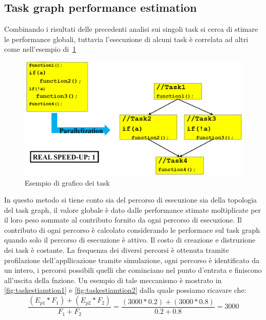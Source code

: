 \subsection{Task graph performance estimation}
Combinando i risultati delle precedenti analisi sui singoli task si cerca di stimare le performance globali, tuttavia l'esecuzione di alcuni task è correlata ad altri come nell'esempio di \figurename\,\ref{fig:taskgraph}
\begin{figure}
\centering
\includegraphics[scale=0.3]{img/taskgraph.png}
\caption{Esempio di grafico dei task}\label{fig:taskgraph}
\end{figure}
In questo metodo si tiene conto sia del percorso di esecuzione sia della topologia del task graph, il valore globale è dato dalle performance stimate moltiplicate per il loro peso sommate al contributo fornito da ogni percorso di esecuzione. Il contributo di ogni percorso è calcolato considerando le performace sul task graph quando solo il percorso di esecuzione è attivo. Il costo di creazione e distruzione dei task è costante. La frequenza dei diversi percorsi è ottenuta tramite profilazione dell'appllicazione tramite simulazione, ogni percorso è identificato da un intero, i percorsi possibili quelli che cominciano nel punto d'entrata e finiscono all'uscita della fnzione. Un esempio di tale meccanismo è mostrato in \figurename\,\ref{fig:taskestiamtion1} e \ref{fig:taskestiamtion2} dalla quale possiamo ricavare che:
$$\dfrac{(E_{p1}*F_{1})+(E_{p2}*F_{2})}{F_1+F_2}=\dfrac{(3000*0.2)+(3000*0.8)}{0.2+0.8}=3000$$
